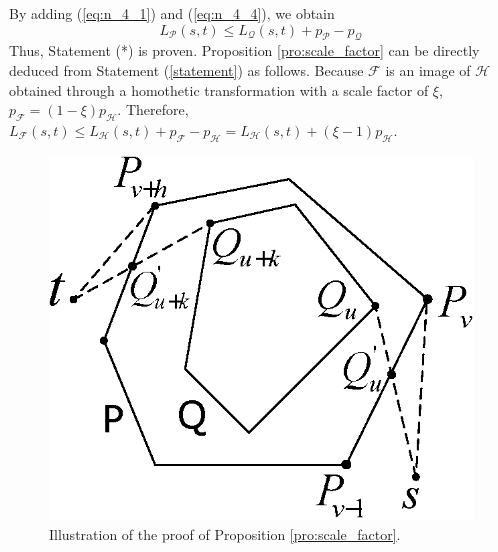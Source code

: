 \begin{myproof}
\begin{equation}
\end{equation}
By adding (\ref{eq:n_4_1}) and (\ref{eq:n_4_4}), we obtain
\begin{equation}
\nonumber L_\mathcal{P}(s,t) \leq   L_\mathcal{Q}(s,t) + p_\mathcal{P} - p_\mathcal{Q}
\end{equation}
Thus, Statement (*) is proven. Proposition \ref{pro:scale_factor} can be directly deduced from Statement (\ref{statement}) as follows.
Because $\mathcal{F}$ is an image of $\mathcal{H}$ obtained through a homothetic transformation with a scale factor of $\xi$, $p_{\mathcal{F}} = (1-\xi)p_{\mathcal{H}}$.
Therefore, $L_\mathcal{F}(s,t) \leq  L_\mathcal{H}(s,t) + p_\mathcal{F} - p_\mathcal{H} = L_\mathcal{H}(s,t) + (\xi-1)p_\mathcal{H}$.
\end{myproof} 
\begin{figure}[hbt]
	\centering
	\includegraphics[width =0.35\columnwidth]{./appendix/proof_1.eps}
	\caption{Illustration of the proof of  Proposition \ref{pro:scale_factor}.\label{fig:pro_1}}
\end{figure}
